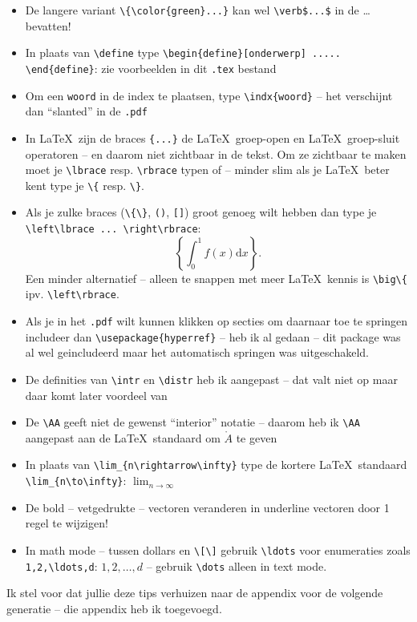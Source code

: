 \documentclass[a4paper]{exam}
\theoremstyle{definition}
\newtheorem*{define}{Definitie}
\DeclareMathOperator{\intr}{\mathop{int}}
\newcommand{\indx}[1]{\index{#1}{\sl #1}}%
\begin{document}
\begin{itemize}
\item De langere variant \verb$\{\color{green}...}$ kan wel \verb#\verb$...$# in de \dots bevatten!
\item In plaats van \verb$\define$ type \verb$\begin{define}[onderwerp] ..... \end{define}$: zie voorbeelden in dit \verb$.tex$ bestand
\item Om een \verb$woord$ in de index te plaatsen, type \verb$\indx{woord}$ -- het verschijnt dan ``slanted'' in de \verb$.pdf$
\item In \LaTeX\ zijn de braces \verb${...}$ de \LaTeX\ groep-open en \LaTeX\ groep-sluit operatoren -- en daarom niet zichtbaar in de tekst. Om ze zichtbaar te maken moet je \verb$\lbrace$ resp.{} \verb$\rbrace$ typen of -- minder slim als je \LaTeX\ beter kent type je \verb$\{$ resp.{} \verb$\}$.
\item Als je zulke braces (\verb$\{\}$, \verb$()$, \verb$[]$) groot genoeg wilt hebben dan type je \verb$\left\lbrace ... \right\rbrace$:
\[
\left\lbrace \int_0^1 f(x) \text{d}x \right\rbrace.
\]
Een minder alternatief -- alleen te snappen met meer \LaTeX\ kennis is \verb$\big\{$ ipv.{} \verb$\left\rbrace$.
\item Als je in het \verb$.pdf$ wilt kunnen klikken op secties om daarnaar toe te springen includeer dan
\verb$\usepackage{hyperref}$ -- heb ik al gedaan -- dit package was al wel geincludeerd maar het automatisch springen was uitgeschakeld.
\item De definities van \verb$\intr$ en \verb$\distr$ heb ik aangepast -- dat valt niet op maar daar komt later voordeel van
\item De \verb$\AA$ geeft niet de gewenst ``interior'' notatie -- daarom heb ik \verb$\AA$ aangepast aan de \LaTeX\ standaard
om $\mathring{A}$ te geven
\item In plaats van \verb$\lim_{n\rightarrow\infty}$ type de kortere \LaTeX\ standaard \verb$\lim_{n\to\infty}$: $\lim_{n\to\infty}$
\item De bold -- vetgedrukte -- vectoren veranderen in underline vectoren door 1 regel te wijzigen!
\item In math mode -- tussen dollars en \verb$\[\]$ gebruik \verb$\ldots$ voor enumeraties zoals \verb$1,2,\ldots,d$: $1,2,\ldots,d$ -- gebruik \verb$\dots$ alleen in text mode.
\end{itemize}
Ik stel voor dat jullie deze tips verhuizen naar de appendix voor de volgende generatie -- die appendix heb ik toegevoegd.
\end{document}
